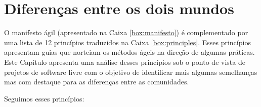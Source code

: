 \chapter{Diferenças entre os dois mundos}
\label{cap:diferencas}

O manifesto ágil (apresentado na Caixa \ref{box:manifesto}) é
complementado por uma lista de 12 princípios traduzidos na Caixa
\ref{box:principles}. Esses princípios apresentam guias que norteiam
os métodos ágeis na direção de algumas práticas. Este Capítulo
apresenta uma análise desses princípios sob o ponto de vista de
projetos de software livre com o objetivo de identificar mais algumas
semelhanças mas com destaque para as diferenças entre as comunidades.

\begin{caixa}[htb]
  \begin{minipage}{\linewidth}
    \centering Seguimos esses princípios:


\end{minipage}
\end{caixa}
